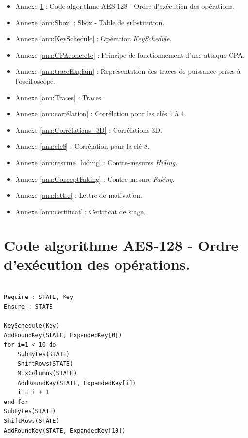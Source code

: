 \documentclass[oneside]{book}
\begin{document}
\begin{itemize}
\item Annexe \ref{ann:AES} : Code algorithme AES-128 - Ordre d'exécution des opérations.
\item Annexe \ref{ann:Sbox} : Sbox - Table de substitution.
\item Annexe \ref{ann:KeySchedule} : Opération \textit{KeySchedule}.
\item Annexe \ref{ann:CPAconcrete} : Principe de fonctionnement d'une attaque CPA.
\item Annexe \ref{ann:traceExplain} : Représentation des traces de puissance prises à l'oscilloscope.
\item Annexe \ref{ann:Traces} : Traces.
\item Annexe \ref{ann:corrélation} : Corrélation pour les clés 1 à 4.
\item Annexe \ref{ann:Corrélations_3D} : Corrélations 3D.
\item Annexe \ref{ann:cle8} : Corrélation pour la clé 8.
\item Annexe \ref{ann:resume_hiding} : Contre-mesures \textit{Hiding}.
\item Annexe \ref{ann:ConceptFaking} : Contre-mesure \textit{Faking}.
\item Annexe \ref{ann:lettre} : Lettre de motivation.
\item Annexe \ref{ann:certificat} : Certificat de stage.
\end{itemize}

\lhead{}

\newpage

\section{Code algorithme AES-128 - Ordre d'exécution des opérations.}
\label{ann:AES}
\lstset{language=Pascal}          %
\begin{lstlisting}[frame=single]  % Start your code-block

Require : STATE, Key
Ensure : STATE

KeySchedule(Key)
AddRoundKey(STATE, ExpandedKey[0])
for i=1 < 10 do
	SubBytes(STATE)
	ShiftRows(STATE)
	MixColumns(STATE)
	AddRoundKey(STATE, ExpandedKey[i])
	i = i + 1
end for
SubBytes(STATE)
ShiftRows(STATE)
AddRoundKey(STATE, ExpandedKey[10])
\end{lstlisting}
\end{document}
